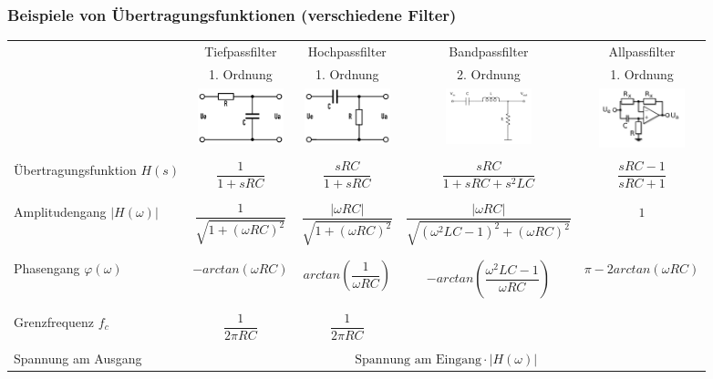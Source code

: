 		\subsubsection{Beispiele von Übertragungsfunktionen (verschiedene Filter)}
		\renewcommand{\arraystretchOriginal}{1}
		\begin{tabularx}{\textwidth}{|X|c|c|c|c|}
			\hline
			{}
			&	Tiefpassfilter
			&	Hochpassfilter
			&	Bandpassfilter
			&	Allpassfilter
			\\
			{}
			&	1. Ordnung
			&	1. Ordnung
			&	2. Ordnung
			&	1. Ordnung
			\\ \hline
			{}
			&	\includegraphics[width=2.5cm]{./bilder/tiefpass.png}
			&	\includegraphics[width=2.5cm]{./bilder/hochpass.png}
			&	\includegraphics[width=2.5cm]{./bilder/bandpass.png}
			&	\includegraphics[width=2.5cm]{./bilder/allpass.png}
			\\ \hline & & & & \\
			Übertragungsfunktion $H(s)$
			&	$\dfrac{1}{1 + sRC}$
			&	$\dfrac{sRC}{1 + sRC}$
			&	$\dfrac{sRC}{1 + sRC + s^2 LC}$
			&	$\dfrac{sRC - 1}{sRC + 1}$
			\\ & & & & \\ \hline & & & & \\
			Amplitudengang $|H(\omega)|$
			&	$\dfrac{1}{\sqrt{1 + (\omega RC)^2}}$
			&	$\dfrac{|\omega RC|}{\sqrt{1 + (\omega RC)^2}}$
			&	$\dfrac{|\omega RC|}{\sqrt{(\omega^2 LC - 1)^2 + (\omega RC)^2}}$
			&	$1$
			\\ & & & & \\ \hline & & & & \\
			Phasengang $\varphi(\omega)$
			&	$-arctan(\omega RC)$
			&	$arctan(\dfrac{1}{\omega RC})$
			&	$-arctan(\dfrac{\omega^2 LC -1}{\omega RC})$
			&	$\pi - 2 arctan(\omega RC)$
			\\ & & & & \\ \hline & & & & \\
			Grenzfrequenz $f_c$
			&	$\dfrac{1}{2 \pi RC}$
			&	$\dfrac{1}{2 \pi RC}$
			&
			& 	
			\\ & & & & \\ \hline
			Spannung am Ausgang
			&	\multicolumn{4}{|c|}{
				$\text{Spannung am Eingang} \cdot |H(\omega)|$
			}
			\\ \hline
		\end{tabularx}
		
